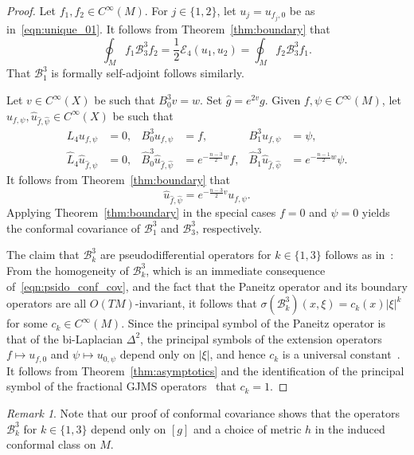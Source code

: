 \documentclass{amsart}
\theoremstyle{definition}
\theoremstyle{remark}
\newtheorem{remark}[thm]{Remark}
\numberwithin{equation}{section}
\begin{document}
\begin{proof}
 Let $f_1,f_2\in C^\infty(M)$.  For $j\in\{1,2\}$, let $u_j=u_{f_j,0}$ be as in~\eqref{eqn:unique_01}.  It follows from Theorem~\ref{thm:boundary} that
 \[ \oint_M f_1{\mathcal{B}}_3^3f_2 = \frac{1}{2}{\mathcal{E}}_4(u_1,u_2) = \oint_M f_2{\mathcal{B}}_3^3 f_1 . \]
 That ${\mathcal{B}}_1^3$ is formally self-adjoint follows similarly.

 Let $v\in C^\infty(X)$ be such that $B_0^3v=w$.  Set ${\widehat{g}}=e^{2v}g$.  Given $f,\psi\in C^\infty(M)$, let $u_{f,\psi},{\widehat{u}}_{{\widehat{f}},{\widehat{\psi}}}\in C^\infty(X)$ be such that
 \begin{align*}
  L_4u_{f,\psi}&=0, & B_0^3u_{f,\psi}&=f, & B_1^3u_{f,\psi}&=\psi, \\
  {\widehat{L}}_4{\widehat{u}}_{{\widehat{f}},\psi}&=0, & {\widehat{B}}_0^3{\widehat{u}}_{{\widehat{f}},{\widehat{\psi}}}&=e^{-\frac{n-3}{2}w}f, & {\widehat{B}}_1^3{\widehat{u}}_{{\widehat{f}},{\widehat{\psi}}}&=e^{-\frac{n-1}{2}w}\psi .
 \end{align*}
 It follows from Theorem~\ref{thm:boundary} that
 \[ {\widehat{u}}_{{\widehat{f}},{\widehat{\psi}}} = e^{-\frac{n-3}{2}v}u_{f,\psi} . \]
 Applying Theorem~\ref{thm:boundary} in the special cases $f=0$ and $\psi=0$ yields the conformal covariance of ${\mathcal{B}}_1^3$ and ${\mathcal{B}}_3^3$, respectively.

 The claim that ${\mathcal{B}}_k^3$ are pseudodifferential operators for $k\in\{1,3\}$ follows as in~\cite{BransonGover2001}: From the homogeneity of ${\mathcal{B}}_k^3$, which is an immediate consequence of~\eqref{eqn:psido_conf_cov}, and the fact that the Paneitz operator and its boundary operators are all $O(TM)$-invariant, it follows that $\sigma({\mathcal{B}}_k^3)(x,\xi)=c_k(x){\lvert}\xi{\rvert}^k$ for some $c_k\in C^\infty(M)$.  Since the principal symbol of the Paneitz operator is that of the bi-Laplacian $\Delta^2$, the principal symbols of the extension operators $f\mapsto u_{f,0}$ and $\psi\mapsto u_{0,\psi}$ depend only on ${\lvert}\xi{\rvert}$, and hence $c_k$ is a universal constant~\cite{Kumano-go1981}.  It follows from Theorem~\ref{thm:asymptotics} and the identification of the principal symbol of the fractional GJMS operators~\cite{GrahamZworski2003} that $c_k=1$.
\end{proof}

\begin{remark}
 Note that our proof of conformal covariance shows that the operators ${\mathcal{B}}_k^3$ for $k\in\{1,3\}$ depend only on $[g]$ and a choice of metric $h$ in the induced conformal class on $M$.
\end{remark}
\end{document}
